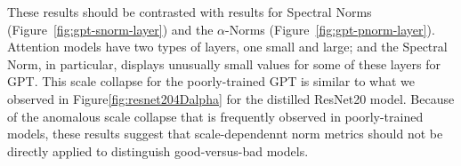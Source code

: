 These results should be contrasted with results for Spectral Norms (Figure~\ref{fig:gpt-snorm-layer}) and the $\alpha$-Norms (Figure~\ref{fig:gpt-pnorm-layer}).
Attention models have two types of layers, one small and large; and the Spectral Norm, in particular, displays unusually small values for some of these layers for GPT.
This scale collapse for the poorly-trained GPT is similar to what we observed in Figure\ref{fig:resnet204Dalpha} for the distilled ResNet20 model.
Because of the anomalous scale collapse that is frequently observed in poorly-trained models, these results suggest that scale-dependennt norm metrics should not be directly applied to distinguish good-versus-bad models. 

